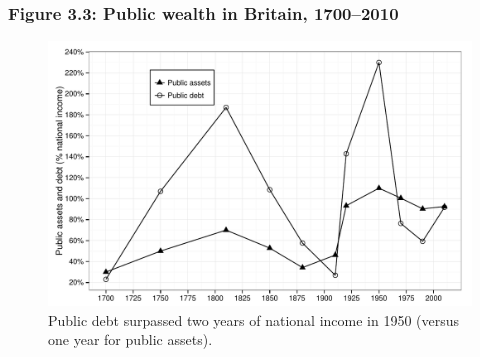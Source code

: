 \documentclass[t]{beamer}\usepackage[]{graphicx}\usepackage[]{color}
\newenvironment{knitrout}{}{} %
\begin{document}
\begin{frame}[label=Figure_3_3]
\frametitle{Figure 3.3: Public wealth in Britain, 1700--2010}
\begin{figure}[t]
\begin{minipage}[b]{\textwidth}
\centering
\begin{knitrout}\footnotesize
{}\color{fgcolor}

{\centering \includegraphics[width=1\linewidth]{figures/bw/Figure_3_3} 

}



\end{knitrout}
\caption{Public debt surpassed two years of national income in 1950 (versus one year for public assets).}
\end{minipage}
\end{figure}
\end{frame}
\end{document}
